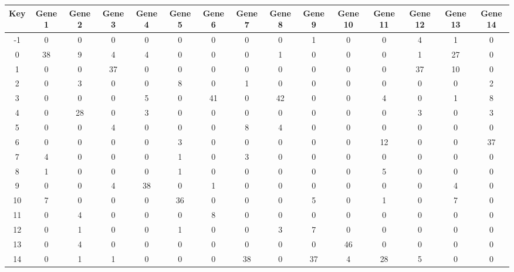 \begin{tabular}{|c|c|c|c|c|c|c|c|c|c|c|c|c|c|c|}
\hline
Key & Gene 1 & Gene 2 & Gene 3 & Gene 4 & Gene 5 & Gene 6 & Gene 7 & Gene 8 & Gene 9 & Gene 10 & Gene 11 & Gene 12 & Gene 13 & Gene 14 \\
\hline
-1 & 0 & 0 & 0 & 0 & 0 & 0 & 0 & 0 & 1 & 0 & 0 & 4 & 1 & 0 \\
0 & 38 & 9 & 4 & 4 & 0 & 0 & 0 & 1 & 0 & 0 & 0 & 1 & 27 & 0 \\
1 & 0 & 0 & 37 & 0 & 0 & 0 & 0 & 0 & 0 & 0 & 0 & 37 & 10 & 0 \\
2 & 0 & 3 & 0 & 0 & 8 & 0 & 1 & 0 & 0 & 0 & 0 & 0 & 0 & 2 \\
3 & 0 & 0 & 0 & 5 & 0 & 41 & 0 & 42 & 0 & 0 & 4 & 0 & 1 & 8 \\
4 & 0 & 28 & 0 & 3 & 0 & 0 & 0 & 0 & 0 & 0 & 0 & 3 & 0 & 3 \\
5 & 0 & 0 & 4 & 0 & 0 & 0 & 8 & 4 & 0 & 0 & 0 & 0 & 0 & 0 \\
6 & 0 & 0 & 0 & 0 & 3 & 0 & 0 & 0 & 0 & 0 & 12 & 0 & 0 & 37 \\
7 & 4 & 0 & 0 & 0 & 1 & 0 & 3 & 0 & 0 & 0 & 0 & 0 & 0 & 0 \\
8 & 1 & 0 & 0 & 0 & 1 & 0 & 0 & 0 & 0 & 0 & 5 & 0 & 0 & 0 \\
9 & 0 & 0 & 4 & 38 & 0 & 1 & 0 & 0 & 0 & 0 & 0 & 0 & 4 & 0 \\
10 & 7 & 0 & 0 & 0 & 36 & 0 & 0 & 0 & 5 & 0 & 1 & 0 & 7 & 0 \\
11 & 0 & 4 & 0 & 0 & 0 & 8 & 0 & 0 & 0 & 0 & 0 & 0 & 0 & 0 \\
12 & 0 & 1 & 0 & 0 & 1 & 0 & 0 & 3 & 7 & 0 & 0 & 0 & 0 & 0 \\
13 & 0 & 4 & 0 & 0 & 0 & 0 & 0 & 0 & 0 & 46 & 0 & 0 & 0 & 0 \\
14 & 0 & 1 & 1 & 0 & 0 & 0 & 38 & 0 & 37 & 4 & 28 & 5 & 0 & 0 \\
\hline
\end{tabular}